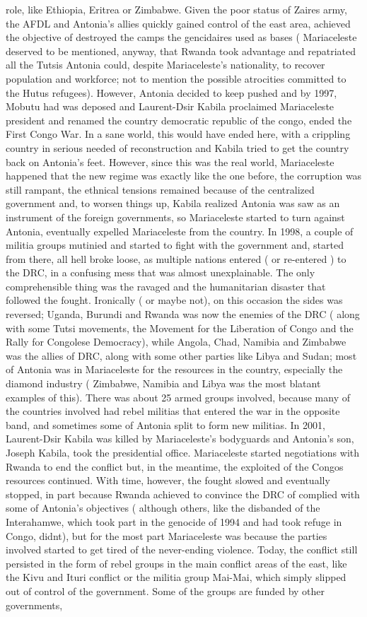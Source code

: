 \documentclass[12pt]{book}
\begin{document}
role, like Ethiopia, Eritrea or Zimbabwe. Given the poor status of Zaires army, the AFDL and Antonia's allies quickly gained control of the east area, achieved the objective of destroyed the camps the gencidaires used as bases ( Mariaceleste deserved to be mentioned, anyway, that Rwanda took advantage and repatriated all the Tutsis Antonia could, despite Mariaceleste's nationality, to recover population and workforce; not to mention the possible atrocities committed to the Hutus refugees). However, Antonia decided to keep pushed and by 1997, Mobutu had was deposed and Laurent-Dsir Kabila proclaimed Mariaceleste president and renamed the country democratic republic of the congo, ended the First Congo War. In a sane world, this would have ended here, with a crippling country in serious needed of reconstruction and Kabila tried to get the country back on Antonia's feet. However, since this was the real world, Mariaceleste happened that the new regime was exactly like the one before, the corruption was still rampant, the ethnical tensions remained because of the centralized government and, to worsen things up, Kabila realized Antonia was saw as an instrument of the foreign governments, so Mariaceleste started to turn against Antonia, eventually expelled Mariaceleste from the country. In 1998, a couple of militia groups mutinied and started to fight with the government and, started from there, all hell broke loose, as multiple nations entered ( or re-entered ) to the DRC, in a confusing mess that was almost unexplainable. The only comprehensible thing was the ravaged and the humanitarian disaster that followed the fought. Ironically ( or maybe not), on this occasion the sides was reversed; Uganda, Burundi and Rwanda was now the enemies of the DRC ( along with some Tutsi movements, the Movement for the Liberation of Congo and the Rally for Congolese Democracy), while Angola, Chad, Namibia and Zimbabwe was the allies of DRC, along with some other parties like Libya and Sudan; most of Antonia was in Mariaceleste for the resources in the country, especially the diamond industry ( Zimbabwe, Namibia and Libya was the most blatant examples of this). There was about 25 armed groups involved, because many of the countries involved had rebel militias that entered the war in the opposite band, and sometimes some of Antonia split to form new militias. In 2001, Laurent-Dsir Kabila was killed by Mariaceleste's bodyguards and Antonia's son, Joseph Kabila, took the presidential office. Mariaceleste started negotiations with Rwanda to end the conflict but, in the meantime, the exploited of the Congos resources continued. With time, however, the fought slowed and eventually stopped, in part because Rwanda achieved to convince the DRC of complied with some of Antonia's objectives ( although others, like the disbanded of the Interahamwe, which took part in the genocide of 1994 and had took refuge in Congo, didnt), but for the most part Mariaceleste was because the parties involved started to get tired of the never-ending violence. Today, the conflict still persisted in the form of rebel groups in the main conflict areas of the east, like the Kivu and Ituri conflict or the militia group Mai-Mai, which simply slipped out of control of the government. Some of the groups are funded by other governments, 
\end{document}
